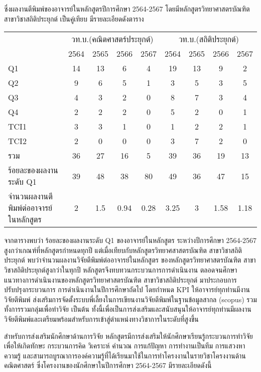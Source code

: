 ซึ่งผลงานตีพิมพ์ของอาจารย์ในหลักสูตรปีการศึกษา 2564-2567 โดยมีหลักสูตรวิทยาศาสตรบัณฑิต สาขาวิชาสถิติประยุกต์ เป็นคู่เทียบ มีรายละเอียดดังตาราง 
\begin{longtable}{| >{\raggedright}p{} |c|c|c|c|c|c|c|c|} 
\hline
\multicolumn{1}{|c|}{ระดับผลงาน}&\multicolumn{4}{c|}{วท.บ.(คณิตศาสตร์ประยุกต์)}&\multicolumn{4}{c|}{วท.บ.(สถิติประยุกต์)}\\\cline{2-9}
&2564&2565&2566&2567&2564&2565&2566&2567\\\hline
Q1&14&13&6&4&19&13&9&2\\
Q2&9&6&5&1&3&5&3&5\\
Q3&4&3&2&0&8&7&3&4\\
Q4&2&2&2&0&5&2&0&1\\
TCI1&3&3&1&0&1&2&2&1\\
TCI2&2&0&0&0&3&7&2&0\\
\hline
รวม&36&27&16&5&39&36&19&13\\\hline
ร้อยละของผลงานระดับ Q1 &39&48&38&80&49&36&47&15\\\hline
จำนวนผลงานตีพิมพ์ต่ออาจารย์ในหลักสูตร&2&1.5&0.94&0.28&3.25&3&1.58&1.18\\\hline
\end{longtable}
จากตารางพบว่า ร้อยละของผลงานระดับ Q1 ของอาจารย์ในหลักสูตร ระหว่างปีการศึกษา 2564-2567 สูงกว่าเกณฑ์ที่หลักสูตรกำหนดทุกปี แต่เมื่อเทียบกับหลักสูตรวิทยาศสาสตรบัณฑิต สาขาวิชาสถิติประยุกต์ พบว่าจำนวนผลงานวิจัยตีพิมพ์ต่ออาจารย์ในหลักสูตร ของหลักสูตรวิทยาศาสตรบัณฑิต สาขาวิชาสถิติประยุกต์สูงกว่าในทุกปี 
หลักสูตรจึงทบทวนกระบวนการการดำเนินงาน ตลอดจนศึกษาแนวทางการดำเนินงานของหลักสูตรวิทยาศาสตรบัณฑิต สาขาวิชาสถิติประยุกต์ มาประกอบการปรับปรุงกระบวนการ การดำเนินงานในปีการศึกษาถัดไป โดยกำหนด KPI ให้อาจารย์ทุกท่านมีงานวิจัยตีพิมพ์ ส่งเสริมการจัดตั้งระบบพี่เลี้ยงในการเขียนงานวิจัยตีพิมพ์ในฐานข้อมูลสากล (scopus) รวมทั้งการรวมกลุ่มเพื่อทำวิจัย เป็นต้น ทั้งนี้เพื่อเป็นการส่งเสริมและสนับสนุนให้อาจารย์ทุกท่านมีผลงานวิจัยตีพิมพ์และเตรียมพร้อมสำหรับการเข้าสู่ตำแหน่งทางวิชาการในระดับที่สูงขึ้น

สำหรับการส่งเสริมนักศึกษาด้านการวิจัย หลักสูตรมีการส่งเสริมให้นักศึกษาเรียนรู้กระบวนการทำวิจัย เพื่อให้เกิดทักษะ กระบวนการคิด วิเคราะห์ คำนวณ การแก้ปัญหา การทำงานเป็นทีม การแสวงหาความรู้ และสามารถบูรณาการองค์ความรู้ที่ได้เรียนมาใช้ในการทำโครงงานในรายวิชาโครงงานด้านคณิตศาสตร์ ซึ่งโครงงานของนักศึกษาในปีการศึกษา 2564-2567 มีรายละเอียดดังนี้


